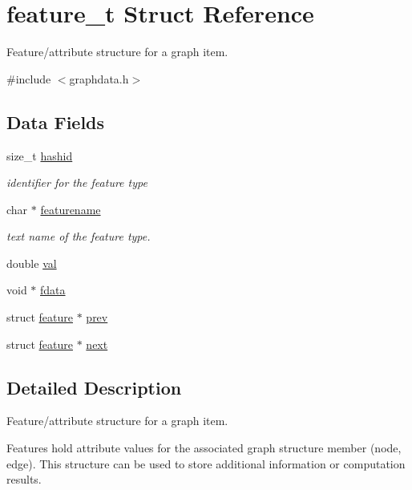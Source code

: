 \hypertarget{structfeature__t}{}\section{feature\+\_\+t Struct Reference}
\label{structfeature__t}


Feature/attribute structure for a graph item.  




{\ttfamily \#include $<$graphdata.\+h$>$}

\subsection*{Data Fields}
\begin{DoxyCompactItemize}
\item 
size\+\_\+t \hyperlink{structfeature__t_a9622cb072e66eb7ad9dd21feeaf8991c}{hashid}
\begin{DoxyCompactList}\small\item\em identifier for the feature type \end{DoxyCompactList}\item 
char $\ast$ \hyperlink{structfeature__t_a2d4a7e92af0cf4e2bdfc04ec3fb60fb5}{featurename}
\begin{DoxyCompactList}\small\item\em text name of the feature type. \end{DoxyCompactList}\item 
double \hyperlink{structfeature__t_ad4881468d7929ea65cb2a3b96e8556da}{val}
\item 
void $\ast$ \hyperlink{structfeature__t_a363d3009c71db9c2294f5227ce186649}{fdata}
\item 
struct \hyperlink{graphdata_8h_a068417678f021a74e911edd39f8d0bce}{feature} $\ast$ \hyperlink{structfeature__t_aaaedf64095bcfa79b578a0d90af17afc}{prev}
\item 
struct \hyperlink{graphdata_8h_a068417678f021a74e911edd39f8d0bce}{feature} $\ast$ \hyperlink{structfeature__t_a827085f4088e261498adaf6f6c70304e}{next}
\end{DoxyCompactItemize}


\subsection{Detailed Description}
Feature/attribute structure for a graph item. 

Features hold attribute values for the associated graph structure member (node, edge). This structure can be used to store additional information or computation results. 

